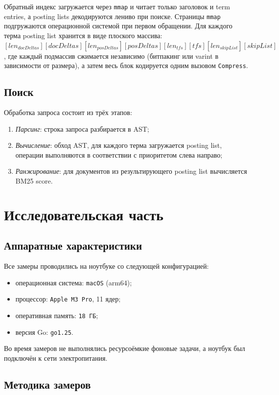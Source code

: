 \documentclass{itmo}
\begin{document}
Обратный индекс загружается через \texttt{mmap} и читает только заголовок и term entries, а posting lists декодируются лениво при поиске.
Страницы \texttt{mmap} подгружаются операционной системой при первом обращении.
Для каждого терма posting list хранится в виде плоского массива: $[len_{docDeltas}][docDeltas][len_{posDeltas}][posDeltas][len_{tfs}][tfs][len_{skipList}][skipList]$, где каждый подмассив сжимается независимо (битпакинг или varint в зависимости от размера), а затем весь блок кодируется одним вызовом \texttt{Compress}.

\section{Поиск}

Обработка запроса состоит из трёх этапов:
\begin{enumerate}
	\item \textit{Парсинг}: строка запроса разбирается в AST;
	\item \textit{Вычисление}: обход AST, для каждого терма загружается posting list, операции выполняются в соответствии с приоритетом слева направо;
	\item \textit{Ранжирование}: для документов из результирующего posting list вычисляется BM25 score.
\end{enumerate}

\chapter{Исследовательская часть}

\section{Аппаратные характеристики}

Все замеры проводились на ноутбуке со следующей конфигурацией:
\begin{itemize}
	\item операционная система: \texttt{macOS} (arm64);
	\item процессор: \texttt{Apple M3 Pro}, 11 ядер;
	\item оперативная память: \texttt{18 ГБ};
	\item версия Go: \texttt{go1.25}.
\end{itemize}
Во время замеров не выполнялись ресурсоёмкие фоновые задачи, а ноутбук был подключён к сети электропитания.

\section{Методика замеров}
\end{document}
